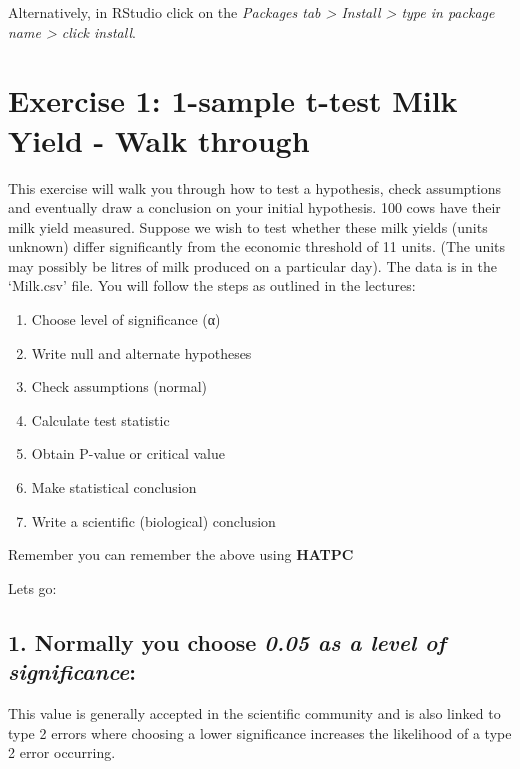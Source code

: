 \documentclass[
  10pt,
  letterpaper,
  DIV=11,
  numbers=noendperiod]{scrartcl}
\providecommand{\tightlist}{%
  \setlength{\itemsep}{0pt}\setlength{\parskip}{0pt}}\usepackage{longtable,booktabs,array}
\begin{document}
Alternatively, in RStudio click on the \emph{Packages tab \textgreater{}
Install \textgreater{} type in package name \textgreater{} click
install}.

\hypertarget{exercise-1-1-sample-t-test-milk-yield---walk-through}{%
\section{Exercise 1: 1-sample t-test Milk Yield - Walk
through}\label{exercise-1-1-sample-t-test-milk-yield---walk-through}}

This exercise will walk you through how to test a hypothesis, check
assumptions and eventually draw a conclusion on your initial hypothesis.
100 cows have their milk yield measured. Suppose we wish to test whether
these milk yields (units unknown) differ significantly from the economic
threshold of 11 units. (The units may possibly be litres of milk
produced on a particular day). The data is in the `Milk.csv' file. You
will follow the steps as outlined in the lectures:

\begin{enumerate}
\def\labelenumi{\arabic{enumi}.}
\tightlist
\item
  Choose level of significance (α)
\item
  Write null and alternate hypotheses
\item
  Check assumptions (normal)
\item
  Calculate test statistic
\item
  Obtain P-value or critical value
\item
  Make statistical conclusion
\item
  Write a scientific (biological) conclusion
\end{enumerate}

Remember you can remember the above using \textbf{HATPC}

Lets go:

\hypertarget{normally-you-choose-0.05-as-a-level-of-significance}{%
\subsection{\texorpdfstring{1. Normally you choose \emph{0.05 as a level
of
significance}:}{1. Normally you choose 0.05 as a level of significance:}}\label{normally-you-choose-0.05-as-a-level-of-significance}}

This value is generally accepted in the scientific community and is also
linked to type 2 errors where choosing a lower significance increases
the likelihood of a type 2 error occurring.
\end{document}
